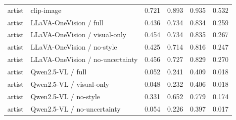 \begin{table}
\begin{tabular}{llrrrr}
artist & clip-image & 0.721 & 0.893 & 0.935 & 0.532 \\
artist & LLaVA-OneVision / full & 0.436 & 0.734 & 0.834 & 0.259 \\
artist & LLaVA-OneVision / visual-only & 0.454 & 0.734 & 0.835 & 0.267 \\
artist & LLaVA-OneVision / no-style & 0.425 & 0.714 & 0.816 & 0.247 \\
artist & LLaVA-OneVision / no-uncertainty & 0.456 & 0.727 & 0.829 & 0.270 \\
artist & Qwen2.5-VL / full & 0.052 & 0.241 & 0.409 & 0.018 \\
artist & Qwen2.5-VL / visual-only & 0.048 & 0.232 & 0.406 & 0.018 \\
artist & Qwen2.5-VL / no-style & 0.331 & 0.652 & 0.779 & 0.174 \\
artist & Qwen2.5-VL / no-uncertainty & 0.054 & 0.226 & 0.397 & 0.017 \\
\bottomrule
\end{tabular}
\end{table}
